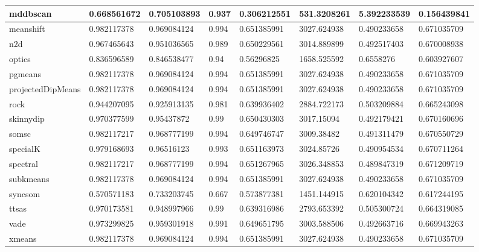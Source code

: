 \begin{table}[H]
\begin{tabular}{|l|l|l|l|l|l|l|l|}
\hline
mddbscan & 0.668561672 & 0.705103893 & 0.937 & 0.306212551 & 531.3208261 & 5.392233539 & 0.156439841 \\
\hline
meanshift & 0.982117378 & 0.969084124 & 0.994 & 0.651385991 & 3027.624938 & 0.490233658 & 0.671035709 \\
\hline
n2d & 0.967465643 & 0.951036565 & 0.989 & 0.650229561 & 3014.889899 & 0.492517403 & 0.670008938 \\
\hline
optics & 0.836596589 & 0.846538477 & 0.94 & 0.56296825 & 1658.525592 & 0.6558276 & 0.603927607 \\
\hline
pgmeans & 0.982117378 & 0.969084124 & 0.994 & 0.651385991 & 3027.624938 & 0.490233658 & 0.671035709 \\
\hline
projectedDipMeans & 0.982117378 & 0.969084124 & 0.994 & 0.651385991 & 3027.624938 & 0.490233658 & 0.671035709 \\
\hline
rock & 0.944207095 & 0.925913135 & 0.981 & 0.639936402 & 2884.722173 & 0.503209884 & 0.665243098 \\
\hline
skinnydip & 0.970377599 & 0.95437872 & 0.99 & 0.650430303 & 3017.15094 & 0.492179421 & 0.670160696 \\
\hline
somsc & 0.982117217 & 0.968777199 & 0.994 & 0.649746747 & 3009.38482 & 0.491311479 & 0.670550729 \\
\hline
specialK & 0.979168693 & 0.96516123 & 0.993 & 0.651163973 & 3024.85726 & 0.490954534 & 0.670711264 \\
\hline
spectral & 0.982117217 & 0.968777199 & 0.994 & 0.651267965 & 3026.348853 & 0.489847319 & 0.671209719 \\
\hline
subkmeans & 0.982117378 & 0.969084124 & 0.994 & 0.651385991 & 3027.624938 & 0.490233658 & 0.671035709 \\
\hline
syncsom & 0.570571183 & 0.733203745 & 0.667 & 0.573877381 & 1451.144915 & 0.620104342 & 0.617244195 \\
\hline
ttsas & 0.970173581 & 0.948997966 & 0.99 & 0.639316986 & 2793.653392 & 0.505300724 & 0.664319085 \\
\hline
vade & 0.973299825 & 0.959301918 & 0.991 & 0.649651795 & 3003.588506 & 0.492663716 & 0.669943263 \\
\hline
xmeans & 0.982117378 & 0.969084124 & 0.994 & 0.651385991 & 3027.624938 & 0.490233658 & 0.671035709 \\
\hline
\end{tabular}
\end{table}